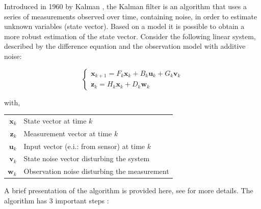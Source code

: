 Introduced in 1960 by Kalman \cite{kalman_new_1960}, the Kalman filter is an algorithm that uses a series of measurements observed over time, containing noise, in order to estimate unknown variables (state vector). Based on a model it is possible to obtain a more robust estimation of the state vector. Consider the following linear system, described by the difference equation and the observation model with additive noise:


\begin{equation}
\left\{ \begin{array}{l}
\textbf{x}_{k+1} = F_{k}\textbf{x}_{k}+B_{k}\textbf{u}_{k}+G_{k}\textbf{v}_{k}\\
\textbf{z}_{k} = H_{k}\textbf{x}_{k}+D_{k}\textbf{w}_{k}
\end{array} \right.
\label{linear_system}
\end{equation}

with,

\begin{center}
\begin{tabular}{rl}
$\textbf{x}_{k} $ &State vector at time $k$\\
$\textbf{z}_{k} $ &Measurement vector at time $k$\\
$\textbf{u}_{k} $ & Input vector (e.i.: from sensor) at time $k$ \\
$\textbf{v}_{k} $ & State noise vector disturbing the system\\
$\textbf{w}_{k} $ & Observation noise disturbing the measurement\\
\end{tabular}
\end{center}

\vspace{0.2cm}


A brief presentation of the algorithm is provided here,  see \cite{terejanu2013discrete} for more details. The algorithm has 3 important steps :\\

